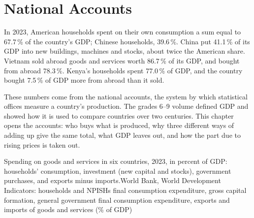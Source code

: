 \chapter{National Accounts}\label{ch:g10:national-accounts}

In 2023, American households spent on their own consumption a sum equal to 67.7\,\% of the country's GDP; Chinese households, 39.6\,\%.
China put 41.1\,\% of its GDP into new buildings, machines and stocks, about twice the American share. Vietnam sold abroad goods and services
worth 86.7\,\% of its GDP, and bought from abroad 78.3\,\%. Kenya's households spent 77.0\,\% of GDP, and the country bought 7.5\,\% of GDP more
from abroad than it sold.

These numbers come from the national accounts, the system by which statistical offices measure a country's production. The grades 6--9
volume defined GDP and showed how it is used to compare countries over two centuries. This chapter opens the accounts: who buys what is
produced, why three different ways of adding up give the same total, what GDP leaves out, and how the part due to rising prices is taken out.

\begin{openingchart}{Spending on goods and services in six countries, 2023, in percent of GDP: households' consumption, investment (new capital
and stocks), government purchases, and exports minus imports.}{World Bank, World Development Indicators: households and NPISHs final consumption expenditure,
gross capital formation, general government final consumption expenditure, exports and imports of goods and services (\% of GDP)}
\end{openingchart}

